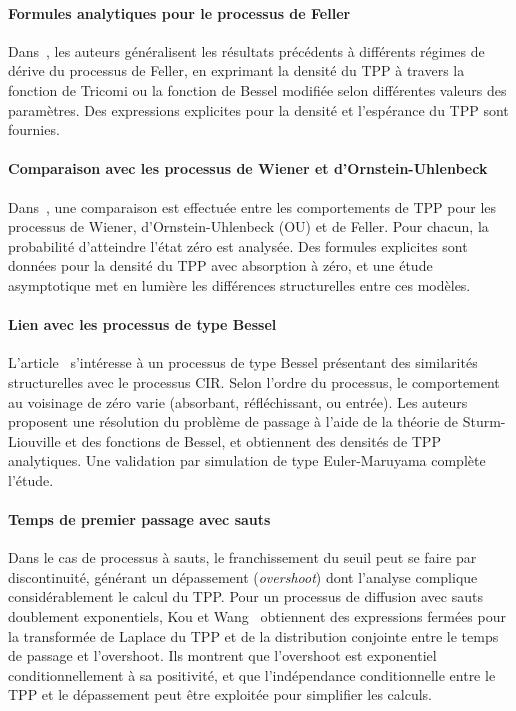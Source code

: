 \paragraph{Formules analytiques pour le processus de Feller}

Dans~\cite{giorno2021}, les auteurs généralisent les résultats précédents à différents régimes de dérive du processus de Feller, en exprimant la densité du \acs{TPP} à travers la fonction de Tricomi ou la fonction de Bessel modifiée selon différentes valeurs des paramètres. Des expressions explicites pour la densité et l'espérance du \acs{TPP} sont fournies.

\paragraph{Comparaison avec les processus de Wiener et d'Ornstein-Uhlenbeck}

Dans~\cite{giorno2023}, une comparaison est effectuée entre les comportements de \acs{TPP} pour les processus de Wiener, d'Ornstein-Uhlenbeck (OU) et de Feller. Pour chacun, la probabilité d'atteindre l'état zéro est analysée. Des formules explicites sont données pour la densité du \acs{TPP} avec absorption à zéro, et une étude asymptotique met en lumière les différences structurelles entre ces modèles.

\paragraph{Lien avec les processus de type Bessel}

L'article~\cite{martin2011} s'intéresse à un processus de type Bessel présentant des similarités structurelles avec le processus \acs{CIR}. Selon l'ordre du processus, le comportement au voisinage de zéro varie (absorbant, réfléchissant, ou entrée). Les auteurs proposent une résolution du problème de passage à l'aide de la théorie de Sturm-Liouville et des fonctions de Bessel, et obtiennent des densités de \acs{TPP} analytiques. Une validation par simulation de type Euler-Maruyama complète l'étude.

\paragraph{Temps de premier passage avec sauts}

Dans le cas de processus à sauts, le franchissement du seuil peut se faire par discontinuité, générant un dépassement (\textit{overshoot}) dont l'analyse complique considérablement le calcul du \acs{TPP}. Pour un processus de diffusion avec sauts doublement exponentiels, Kou et Wang~\cite{kou2003} obtiennent des expressions fermées pour la transformée de Laplace du \acs{TPP} et de la distribution conjointe entre le temps de passage et l'overshoot. Ils montrent que l'overshoot est exponentiel conditionnellement à sa positivité, et que l'indépendance conditionnelle entre le \acs{TPP} et le dépassement peut être exploitée pour simplifier les calculs.

